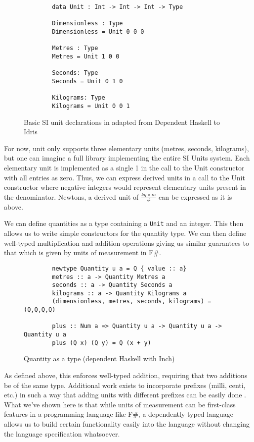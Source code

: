 \begin{figure}[h]
    \caption{Basic SI unit declarations in adapted from Dependent Haskell to Idris \cite{gundry2013}}
    \begin{lstlisting}
        data Unit : Int -> Int -> Int -> Type
        
        Dimensionless : Type
        Dimensionless = Unit 0 0 0
        
        Metres : Type
        Metres = Unit 1 0 0
        
        Seconds: Type
        Seconds = Unit 0 1 0
        
        Kilograms: Type
        Kilograms = Unit 0 0 1
    \end{lstlisting}
\end{figure}

For now, unit only supports three elementary units (metres, seconds, kilograms),
but one can imagine a full library implementing the entire SI Units system. Each
elementary unit is implemented as a single 1 in the call to the Unit constructor
with all entries as zero. Thus, we can express derived units in a call to the
Unit constructor where negative integers would represent elementary units
present in the denominator. Newtons, a derived unit of $\frac{kg \times m}{s^2}$ can be expressed as it is above. 

We can define quantities as a type containing a \texttt{Unit} and an integer. This then allows us to write simple constructors for the quantity type. We can
 then define well-typed multiplication and addition operations
giving us similar guarantees to that which is given by units of measurement in
F\#. 

\begin{figure}[h]
    \caption{Quantity as a type (dependent Haskell with Inch) \cite{gundry2013}}
    \begin{lstlisting}
        newtype Quantity u a = Q { value :: a}
        metres :: a -> Quantity Metres a
        seconds :: a -> Quantity Seconds a
        kilograms :: a -> Quantity Kilograms a
        (dimensionless, metres, seconds, kilograms) = (Q,Q,Q,Q)

        plus :: Num a => Quantity u a -> Quantity u a -> Quantity u a
        plus (Q x) (Q y) = Q (x + y)
    \end{lstlisting}
\end{figure}

As defined above, this enforces well-typed addition, requiring that two
additions be of the same type. Additional work exists to incorporate prefixes
(milli, centi, etc.) in such a way that adding units with different prefixes can
be easily done \cite{gundry2013}. What we've shown here is that while units of
measurement can be first-class features in a programming language like F\#, a
dependently typed language allows us to build certain functionality easily into
the language without changing the language specification whatsoever. 

